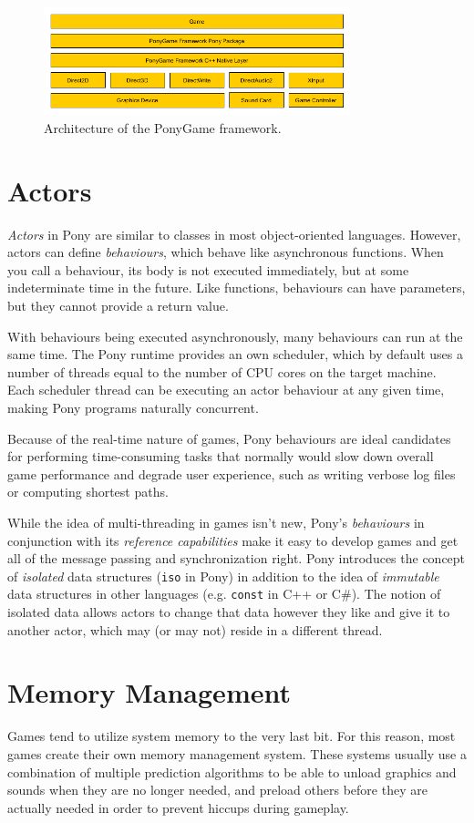\documentclass[9pt,conference]{IEEEtran}
\begin{document}
\begin{figure}[h]
\centering
\includegraphics[width=3.5in]{PonyGame.png}
\caption{Architecture of the PonyGame framework.}
\label{fig_ponygame_architecture}
\end{figure}


\section{Actors}
\emph{Actors} in Pony are similar to classes in most object-oriented languages.
However, actors can define \emph{behaviours}, which behave like asynchronous
functions. When you call a behaviour, its body is not executed immediately, but
at some indeterminate time in the future. Like functions, behaviours can have
parameters, but they cannot provide a return value.

With behaviours being executed asynchronously, many behaviours can run at the
same time. The Pony runtime provides an own scheduler, which by default uses a
number of threads equal to the number of CPU cores on the target machine. Each
scheduler thread can be executing an actor behaviour at any given time, making
Pony programs naturally concurrent.

Because of the real-time nature of games, Pony behaviours are ideal candidates
for performing time-consuming tasks that normally would slow down overall game 
performance and degrade user experience, such as writing verbose log files or
computing shortest paths.

While the idea of multi-threading in games isn't new, Pony's \emph{behaviours}
in conjunction with its \emph{reference capabilities} make it easy to develop
games and get all of the message passing and synchronization right. Pony
introduces the concept of \emph{isolated} data structures (\texttt{iso} in Pony)
in addition to the idea of \emph{immutable} data structures in other languages
(e.g. \texttt{const} in C++ or C\#). The notion of isolated data allows actors
to change that data however they like and give it to another actor, which may
(or may not) reside in a different thread.


\section{Memory Management}
Games tend to utilize system memory to the very last bit. For this reason, most
games create their own memory management system. These systems usually use a
combination of multiple prediction algorithms to be able to unload graphics
and sounds when they are no longer needed, and preload others before they are
actually needed in order to prevent hiccups during gameplay.
\end{document}
